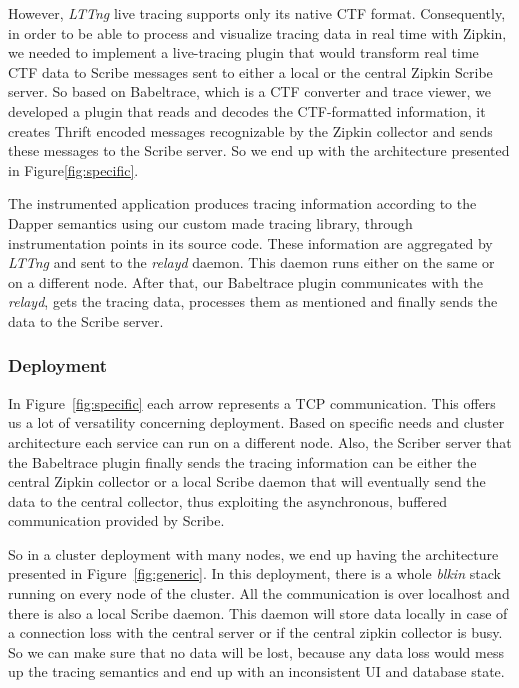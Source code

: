 \documentclass[a4paper,10pt,twocolumn]{article}
\begin{document}
However, \emph{LTTng} live tracing supports only its native CTF format.
Consequently, in order to be able to process and visualize tracing data in real
time with Zipkin, we needed to implement a live-tracing plugin that would
transform real time CTF data to Scribe messages sent to either a local or the
central Zipkin Scribe server. So based on Babeltrace\cite{bltrace}, which is a
CTF converter and trace viewer, we developed a plugin that reads and decodes the
CTF-formatted information, it creates Thrift\cite{thrift} encoded messages
recognizable by the Zipkin collector and sends these messages to the Scribe
server. So we end up with the architecture presented in
Figure\ref{fig:specific}.

The instrumented application produces tracing information according to the
Dapper semantics using our custom made tracing library, through instrumentation
points in its source code. These information are aggregated by \emph{LTTng} and
sent to the \emph{relayd} daemon. This daemon runs either on the same or on a
different node. After that, our Babeltrace plugin communicates with the
\emph{relayd}, gets the tracing data, processes them as mentioned and finally
sends the data to the Scribe server. 

\subsubsection{Deployment} In Figure~\ref{fig:specific} each arrow represents a
TCP communication. This offers us a lot of versatility concerning deployment.
Based on specific needs and cluster architecture each service can run on a
different node.  Also, the Scriber server that the Babeltrace plugin finally
sends the tracing information can be either the central Zipkin collector or a
local Scribe daemon that will eventually send the data to the central collector,
thus exploiting the asynchronous, buffered communication provided by Scribe.

So in a cluster deployment with many nodes, we end up having the architecture
presented in Figure~\ref{fig:generic}. In this deployment, there is a whole
\emph{blkin} stack running on every node of the cluster. All the communication
is over localhost and there is also a local Scribe daemon. This daemon will
store data locally in case of a connection loss with the central server or if
the central zipkin collector is busy. So we can make sure that no data will be
lost, because any data loss would mess up the tracing semantics and end up with
an inconsistent UI and database state.
\end{document}
